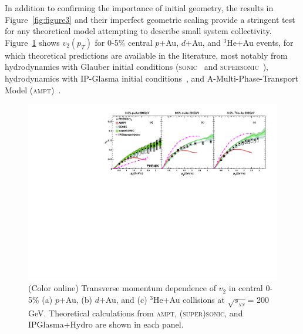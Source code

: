 \documentclass[%
reprint,
showpacs,preprintnumbers,
 amsmath,amssymb,
 aps,
]{revtex4-1}
\newcommand{\pt}{\mbox{$p_T$}\xspace}
\newcommand{\sqsn}{\mbox{$\sqrt{s_{_{NN}}}$}\xspace}
\newcommand{\dau}{\mbox{$d$+Au}\xspace}
\newcommand{\pau}{\mbox{$p$+Au}\xspace}
\newcommand{\hau}{\mbox{$^3\text{He}$+Au}\xspace}
\begin{document}
In addition to confirming the importance of initial geometry, the results in Figure~\ref{fig:figure3} and their imperfect geometric scaling provide a stringent test for any theoretical model attempting to describe small system collectivity. Figure~\ref{fig:figure4} shows $v_2(\pt)$ for 0-5\% central \pau, \dau, and \hau events, for which theoretical predictions are available in the literature, most notably from hydrodynamics with Glauber initial conditions (\textsc{sonic}~\cite{Habich:2014jna} and \textsc{supersonic}~\cite{Romatschke:2015gxa}), hydrodynamics with IP-Glasma initial conditions~\cite{Schenke:2014gaa}, and A-Multi-Phase-Transport Model (\textsc{ampt})~\cite{lin_multiphase_2005}.

\begin{figure}[htbp]
  \includegraphics[scale=0.9]{Figures/figure4}
  \caption{(Color online) Transverse momentum dependence of $v_2$ in central 0-5\% (a) \pau, (b) \dau, and (c) \hau collisions at \sqsn = 200 GeV. Theoretical calculations from \textsc{ampt}, \textsc{(super)sonic}, and IPGlasma+Hydro are shown in each panel.}
\label{fig:figure4}
\end{figure}
\end{document}
